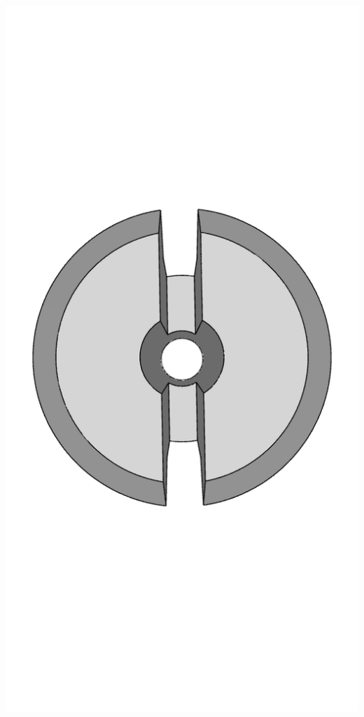 \begin{center}
  \begin{minipage}[b]{0.32\textwidth}
    \includegraphics[width=\textwidth]{../images/3DPrinting/Pin1.png}
  \end{minipage}

\end{center}
